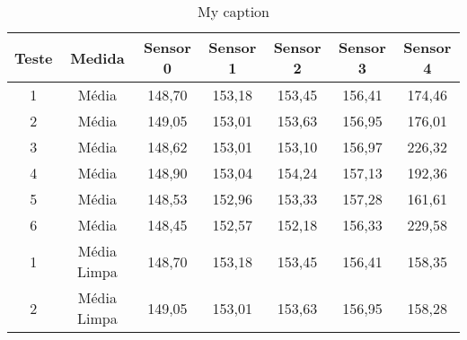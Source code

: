 \begin{table}[]
\centering
\caption{My caption}
\label{my-label}
\begin{tabular}{|c|c|ccccc|}
\hline
\textbf{Teste}            & \textbf{Medida}                                                            & \textbf{Sensor 0}          & \textbf{Sensor 1}          & \textbf{Sensor 2}          & \textbf{Sensor 3}          & \textbf{Sensor 4}           \\ \hline
1                         & Média                                                                      & 148,70                     & 153,18                     & 153,45                     & 156,41                     & 174,46                      \\
2                         & Média                                                                      & 149,05                     & 153,01                     & 153,63                     & 156,95                     & 176,01                      \\
3                         & Média                                                                      & 148,62                     & 153,01                     & 153,10                     & 156,97                     & 226,32                      \\
4                         & Média                                                                      & 148,90                     & 153,04                     & 154,24                     & 157,13                     & 192,36                      \\
5                         & Média                                                                      & 148,53                     & 152,96                     & 153,33                     & 157,28                     & 161,61                      \\
6                         & Média                                                                      & 148,45                     & 152,57                     & 152,18                     & 156,33                     & 229,58                      \\ \hline
1                         & Média Limpa                                                                & 148,70                     & 153,18                     & 153,45                     & 156,41                     & 158,35                      \\
2                         & Média Limpa                                                                & 149,05                     & 153,01                     & 153,63                     & 156,95                     & 158,28                      \\

\end{tabular}
\end{table}
